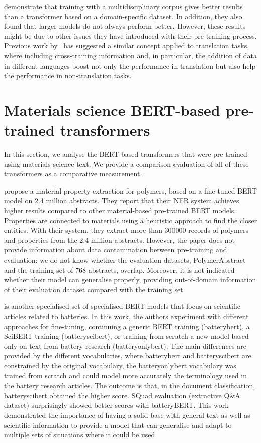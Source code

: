 \cite{hong2022ScholarBERT} demonstrate that training with a multidisciplinary corpus gives better results than a transformer based on a domain-specific dataset. In addition, they also found that larger models do not always perform better. However, these results might be due to other issues they have introduced with their pre-training process. 
Previous work by~\cite{lample2019cross} has suggested a similar concept applied to translation tasks, where including cross-training information and, in particular, the addition of data in different languages boost not only the performance in translation but also help the performance in non-translation tasks. 


\section{Materials science BERT-based pre-trained transformers}

In this section, we analyse the BERT-based transformers that were pre-trained using materials science text. We provide a comparison evaluation of all of these transformers as a comparative measurement. 

\cite{pranav2023a} propose a material-property extraction for polymers, based on a fine-tuned BERT model on 2.4 million abstracts. They report that their NER system achieves higher results compared to other material-based pre-trained BERT models. Properties are connected to materials using a heuristic approach to find the closer entities.
With their system, they extract more than 300000 records of polymers and properties from the 2.4 million abstracts. 
However, the paper does not provide information about data contamination between pre-training and evaluation: we do not know whether the evaluation datasets, PolymerAbstract~\cite{huan2016a} and the training set of 768 abstracts, overlap. 
Moreover, it is not indicated whether their model can generalise properly, providing out-of-domain information of their evaluation dataset compared with the training set. 

\cite{huang2020batterybert} is another specialised set of specialised BERT models that focus on scientific articles related to batteries. In this work, the authors experiment with different approaches for fine-tuning, continuing a generic BERT training (batterybert), a SciBERT training (batteryscibert), or training from scratch a new model based only on text from battery research (batteryonlybert). The main differences are provided by the different vocabularies, where batterybert and batteryscibert are constrained by the original vocabulary, the batteryonlybert vocabulary was trained from scratch and could model more accurately the terminology used in the battery research articles. 
The outcome is that, in the document classification, batteryscibert obtained the higher score. SQuad evaluation (extractive Q\&A dataset) surprisingly showed better scores with batteryBERT. This work demonstrated the importance of having a solid base with general text as well as scientific information to provide a model that can generalise and adapt to multiple sets of situations where it could be used. 

